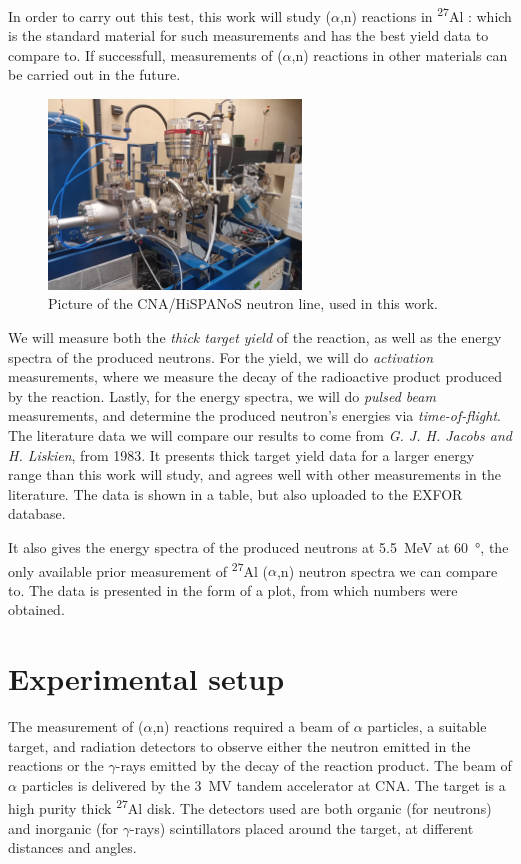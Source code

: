 \documentclass[a4paper,12pt]{report}
\newcommand{\an}{($\alpha$,n) }
\newcommand{\Aliso}{\textsuperscript{27}Al }
\begin{document}
In order to carry out this test, this work will study \an reactions in \Aliso: which is the standard material for such measurements and has the best yield data to compare to.
If successfull, measurements of \an reactions in other materials can be carried out in the future.
\\

\begin{figure}[H]
	\centering
	\includegraphics[width=0.6\textwidth]{neutronline_foto.jpg}
	\caption{Picture of the CNA/HiSPANoS neutron line, used in this work.}
	\label{neutronline_foto}
\end{figure}

We will measure both the \textit{thick target yield} of the reaction, as well as the energy spectra of the produced neutrons.
For the yield, we will do \textit{activation} measurements, where we measure the decay of the radioactive product produced by the reaction.
Lastly, for the energy spectra, we will do \textit{pulsed beam} measurements, and determine the produced neutron's energies via \textit{time-of-flight}.
\\

The literature data we will compare our results to come from \textit{G. J. H. Jacobs and H. Liskien}, from 1983.\cite{jacobs}
It presents thick target yield data for a larger energy range than this work will study, and agrees well with other measurements in the literature.\cite{jacobssupport1}\cite{jacobssupport2}
The data is shown in a table, but also uploaded to the EXFOR database.

It also gives the energy spectra of the produced neutrons at \qty{5.5}{\MeV} at \qty{60}{\degree}, the only available prior measurement of \Aliso\an neutron spectra we can compare to.
The data is presented in the form of a plot, from which numbers were obtained.


\chapter{Experimental setup}
The measurement of \an reactions required a beam of $\alpha$ particles, a suitable target, and radiation detectors to observe either the neutron emitted in the reactions or the $\gamma$-rays emitted by the decay of the reaction product.
The beam of $\alpha$ particles is delivered by the \qty{3}{\mega\volt} tandem accelerator at CNA.
The target is a high purity thick \Aliso disk.
The detectors used are both organic (for neutrons) and inorganic (for $\gamma$-rays) scintillators placed around the target, at different distances and angles.
\end{document}
